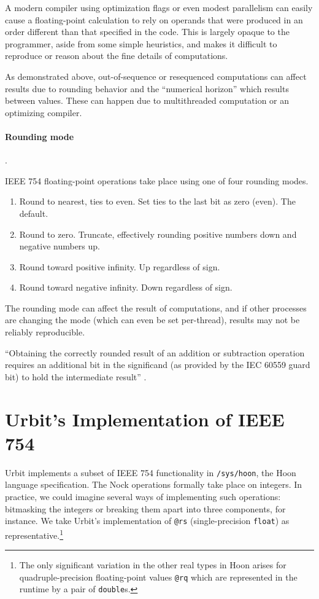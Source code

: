 \documentclass[twoside]{article}
\begin{document}
A modern compiler using optimization flags or even modest parallelism can easily cause a floating-point calculation to rely on operands that were produced in an order different than that specified in the code.  This is largely opaque to the programmer, aside from some simple heuristics, and makes it difficult to reproduce or reason about the fine details of computations.

As demonstrated above, out-of-sequence or resequenced computations can affect results due to rounding behavior and the “numerical horizon” which results between values.  These can happen due to multithreaded computation or an optimizing compiler.

\paragraph{Rounding mode}.

IEEE 754 floating-point operations take place using one of four rounding modes.

\begin{enumerate}
  \item  Round to nearest, ties to even.  Set ties to the last bit as zero (even).  The default.
  \item  Round to zero.  Truncate, effectively rounding positive numbers down and negative numbers up.
  \item  Round toward positive infinity.  Up regardless of sign.
  \item  Round toward negative infinity.  Down regardless of sign.
\end{enumerate}

\noindent
The rounding mode can affect the result of computations, and if other processes are changing the mode (which can even be set per-thread), results may not be reliably reproducible.

“Obtaining the correctly rounded result of an addition or subtraction operation requires an additional bit in the significand (as provided by the IEC 60559 guard bit) to hold the intermediate result” \citep[p.~65]{Jones2008}.


\section{Urbit's Implementation of IEEE 754}

Urbit implements a subset of IEEE 754 functionality in \texttt{/sys/hoon}, the Hoon language specification.  The Nock operations formally take place on integers.  In practice, we could imagine several ways of implementing such operations:  bitmasking the integers or breaking them apart into three components, for instance.  We take Urbit's implementation of \texttt{@rs} (single-precision \texttt{float}) as representative.\footnote{The only significant variation in the other real types in Hoon arises for quadruple-precision floating-point values \texttt{@rq} which are represented in the runtime by a pair of \texttt{double}s.}
\end{document}

